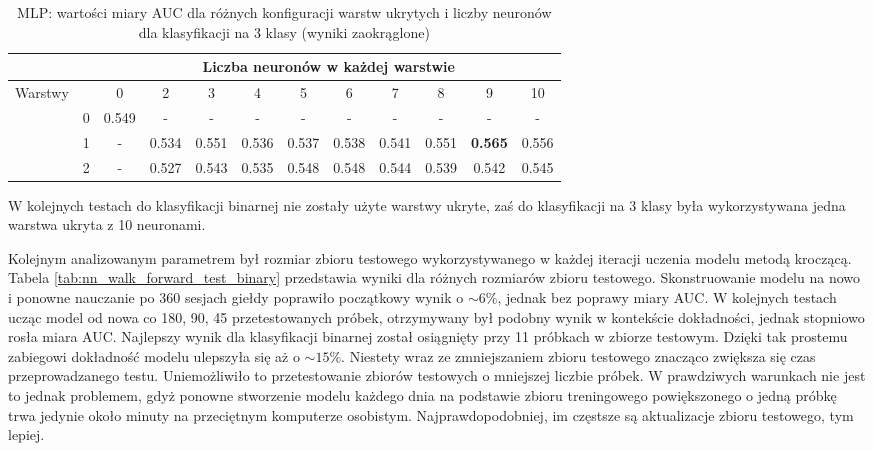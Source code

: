\documentclass[a4paper, twoside, 11pt, openright]{article}
\begin{document}
\begin{table}[H]
    \centering
    \begin{tabular}{|c|c|c|c|c|c|c|c|c|c|c|c|}
        \hline
         & &  \multicolumn{10}{c|}{Liczba neuronów w każdej warstwie}  \\ \hline
        \multirow{4}{*}{Warstwy} & & 0 & 2 & 3 & 4 & 5 & 6 & 7 & 8 & 9 & 10  \\ \cline{2 - 12}
			& 0 & 0.549 & - & - & - & - & - & - & - & - & - \\ \cline{2 - 12} 
			& 1 & - & 0.534 &  0.551 &  0.536 &  0.537 &  0.538 &  0.541 &  0.551 &  \textbf{0.565} & 0.556 \\ \cline{2 - 12} 
			& 2 & - & 0.527 &   0.543 &   0.535 &   0.548 &   0.548 &   0.544 &   0.539 &   0.542 &   0.545  \\ \cline{2 - 12} \hline

    \end{tabular}
    \caption{MLP: wartości miary AUC dla różnych konfiguracji warstw ukrytych i liczby neuronów dla klasyfikacji na 3 klasy (wyniki zaokrąglone)}
    \label{tab:nn_layers_discrete}
\end{table}

W kolejnych testach do klasyfikacji binarnej nie zostały użyte warstwy ukryte, zaś do klasyfikacji na 3 klasy była wykorzystywana jedna warstwa ukryta z 10 neuronami.

\bigskip

Kolejnym analizowanym parametrem był rozmiar zbioru testowego wykorzystywanego w każdej iteracji uczenia modelu metodą kroczącą. Tabela \ref{tab:nn_walk_forward_test_binary} przedstawia wyniki dla różnych rozmiarów zbioru testowego. Skonstruowanie modelu na nowo i ponowne nauczanie po 360 sesjach giełdy poprawiło początkowy wynik o $\sim 6\%$, jednak bez poprawy miary AUC. W kolejnych testach ucząc model od nowa co 180, 90, 45 przetestowanych próbek, otrzymywany był podobny wynik w kontekście dokładności, jednak stopniowo rosła miara AUC. Najlepszy wynik dla klasyfikacji binarnej został osiągnięty przy 11 próbkach w zbiorze testowym. Dzięki tak prostemu zabiegowi dokładność modelu ulepszyła się aż o $\sim 15\%$. Niestety wraz ze zmniejszaniem zbioru testowego znacząco zwiększa się czas przeprowadzanego testu. Uniemożliwiło to przetestowanie zbiorów testowych o mniejszej liczbie próbek. W prawdziwych warunkach nie jest to jednak problemem, gdyż ponowne stworzenie modelu każdego dnia na podstawie zbioru treningowego powiększonego o jedną próbkę trwa jedynie około minuty na przeciętnym komputerze osobistym. Najprawdopodobniej, im częstsze są aktualizacje zbioru testowego, tym lepiej.
\end{document}
